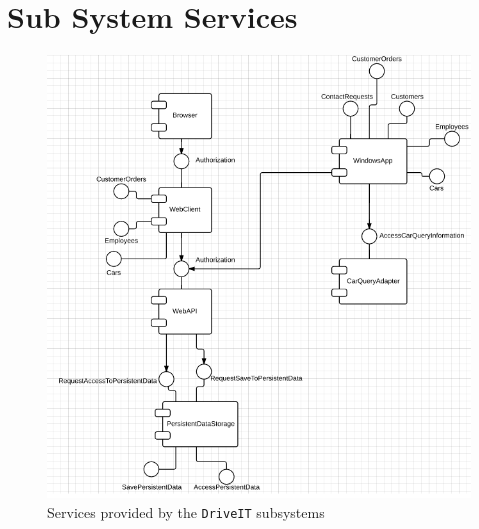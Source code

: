 \chapter{Sub System Services}
\begin{figure}[H]
	\centering
	\includegraphics[width=\textwidth]{Figures/SubsystemServices}
	\caption{Services provided by the \texttt{DriveIT} subsystems}
	\label{fig:subsystemservices}
\end{figure}